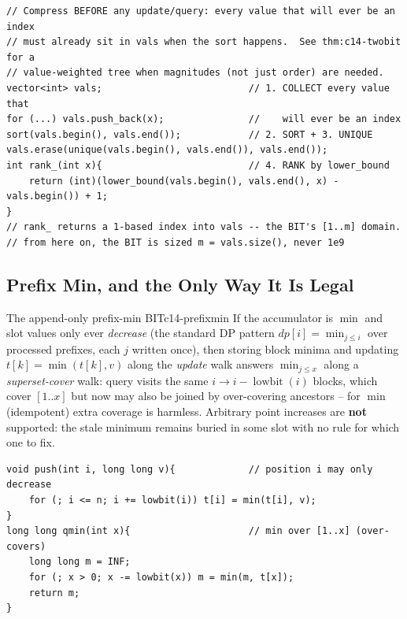 \begin{lstlisting}[caption={standard compression: collect, sort, unique, lower\_bound}, label={lst:c14-compress}]
// Compress BEFORE any update/query: every value that will ever be an index
// must already sit in vals when the sort happens.  See thm:c14-twobit for a
// value-weighted tree when magnitudes (not just order) are needed.
vector<int> vals;                          // 1. COLLECT every value that
for (...) vals.push_back(x);               //    will ever be an index
sort(vals.begin(), vals.end());            // 2. SORT + 3. UNIQUE
vals.erase(unique(vals.begin(), vals.end()), vals.end());
int rank_(int x){                          // 4. RANK by lower_bound
    return (int)(lower_bound(vals.begin(), vals.end(), x) - vals.begin()) + 1;
}
// rank_ returns a 1-based index into vals -- the BIT's [1..m] domain.
// from here on, the BIT is sized m = vals.size(), never 1e9
\end{lstlisting}

\subsection{Prefix Min, and the Only Way It Is Legal}

\begin{proposition}{The append-only prefix-min BIT}{c14-prefixmin}
If the accumulator is \(\min\) and slot values only ever \emph{decrease} (the
standard DP pattern \(\mathit{dp}[i]=\min_{j\le i}\) over processed prefixes,
each \(j\) written once), then storing block minima and updating
\(t[k]=\min(t[k],v)\) along the \emph{update} walk answers
\(\min_{j\le x}\) along a \emph{superset-cover} walk: query visits the same
\(i\to i{-}\operatorname{lowbit}(i)\) blocks, which cover \([1..x]\) but now
may also be joined by over-covering ancestors -- for \(\min\) (idempotent)
extra coverage is harmless.  Arbitrary point increases are \textbf{not}
supported: the stale minimum remains buried in some slot with no rule for
which one to fix.
\end{proposition}

\begin{lstlisting}[caption={prefix-min BIT under monotone writes (query min over [1..x])}, label={lst:c14-min}]
void push(int i, long long v){             // position i may only decrease
    for (; i <= n; i += lowbit(i)) t[i] = min(t[i], v);
}
long long qmin(int x){                     // min over [1..x] (over-covers)
    long long m = INF;
    for (; x > 0; x -= lowbit(x)) m = min(m, t[x]);
    return m;
}
\end{lstlisting}

